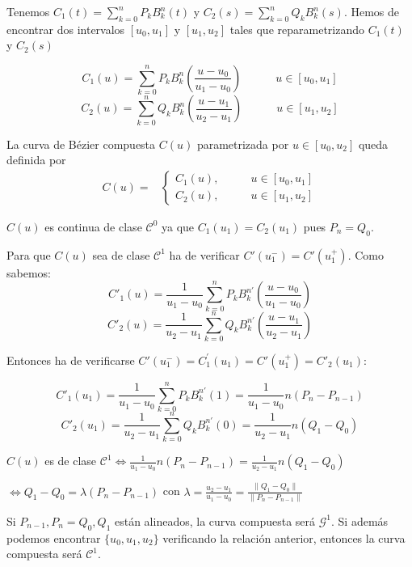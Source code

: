 \documentclass[ebook,oneside]{memoir}
\begin{document}
\vspace{0.3cm}

Tenemos $C_1(t)=\sum_{k=0}^n P_k B_k^n(t)$ y $C_2(s)=\sum_{k=0}^n Q_k B_k^n(s)$. Hemos de encontrar dos intervalos $[u_0,u_1]$ y $[u_1,u_2]$ tales que reparametrizando $C_1(t)$ y $C_2(s)$

$$C_1(u)=\sum_{k=0}^n P_k B_k^n\left(\frac{u-u_0}{u_1-u_0}\right) \quad \quad \quad u\in [u_0,u_1]$$
$$C_2(u)=\sum_{k=0}^n Q_k B_k^n\left(\frac{u-u_1}{u_2-u_1}\right)\quad \quad \quad u\in [u_1,u_2]$$

La curva de B\'{e}zier compuesta $C(u)$ parametrizada por $u\in[u_0,u_2]$ queda definida por
$$\begin{array}{cc} C(u)=& \left\{\begin{array}{cc} C_1(u), & \quad \quad u\in [u_0,u_1]\\ C_2(u), & \quad \quad u\in [u_1,u_2]\end{array}\right. \end{array}$$

$C(u)$ es continua de clase ${\mathcal  C}^0$ ya que $C_1(u_1)=C_2(u_1)$ pues $P_n=Q_0.$

Para que $C(u)$ sea de clase ${\mathcal  C}^1$ ha de verificar $C'(u_1^{-})=C'(u_1^{+}).$ Como sabemos:
$$C'_1(u)=\frac{1}{u_1-u_0}\sum_{k=0}^n P_k B_k^{n \prime} \left(\frac{u-u_0}{u_1-u_0}\right)$$
$$C'_2(u)=\frac{1}{u_2-u_1}\sum_{k=0}^n Q_k B_k^{n \prime} \left(\frac{u-u_1}{u_2-u_1}\right)$$

Entonces ha de verificarse $C'(u_1^{-})=C^{\prime}_1(u_1)=C'(u_1^{+})=C'_2(u_1):$

$$C'_1(u_1)=\frac{1}{u_1-u_0}\sum_{k=0}^n P_k B_k^{n \prime}(1)=\frac{1}{u_1-u_0} n(P_n-P_{n-1})$$
$$C'_2(u_1)=\frac{1}{u_2-u_1}\sum_{k=0}^n Q_k B_k^{n \prime}(0)=\frac{1}{u_2-u_1} n (Q_1-Q_0)$$

$C(u)$ es de clase $\displaystyle {\mathcal  C}^1 \Leftrightarrow \frac{1}{u_1-u_0} n(P_n-P_{n-1})=\frac{1}{u_2-u_1} n (Q_1-Q_0)$

\vspace{0.2cm}

$\displaystyle \Leftrightarrow Q_1-Q_0 = \lambda (P_n-P_{n-1})$ con $\displaystyle \lambda = \frac{u_2-u_1}{u_1-u_0} = \frac{\parallel Q_1-Q_0\parallel}{\parallel P_n-P_{n-1} \parallel}$

\vspace{0.2cm}

Si $P_{n-1}, P_n=Q_0, Q_1$ est\'{a}n alineados, la curva compuesta ser\'{a} ${\mathcal  G}^1.$ Si adem\'{a}s podemos encontrar $\{u_0,u_1,u_2\}$ verificando la relaci\'{o}n anterior, entonces la curva compuesta ser\'{a} ${\mathcal  C}^1$.
\end{document}
